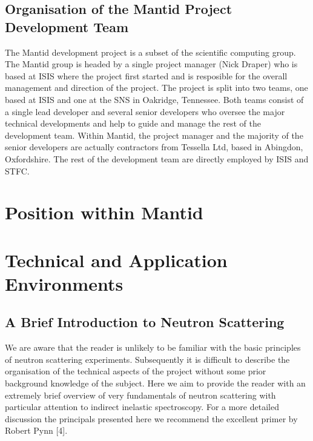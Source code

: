 \documentclass[paper=a4, fontsize=11pt]{scrartcl}	%
\numberwithin{equation}{section}															%
\numberwithin{figure}{section}																%
\numberwithin{table}{section}
\begin{document}
\subsection{Organisation of the Mantid Project Development
Team}\label{organisation-of-the-mantid-project-development-team}

The Mantid development project is a subset of the scientific computing
group. The Mantid group is headed by a single project manager (Nick
Draper) who is based at ISIS where the project first started and is
resposible for the overall management and direction of the project. The
project is split into two teams, one based at ISIS and one at the SNS in
Oakridge, Tennessee. Both teams consist of a single lead developer and
several senior developers who oversee the major technical developments
and help to guide and manage the rest of the development team. Within
Mantid, the project manager and the majority of the senior developers
are actually contractors from Tessella Ltd, based in Abingdon,
Oxfordshire. The rest of the development team are directly employed by
ISIS and STFC.

\section{Position within Mantid}\label{position-within-mantid}

\section{Technical and Application
Environments}\label{technical-and-application-environments}

\subsection{A Brief Introduction to Neutron
Scattering}\label{a-brief-introduction-to-neutron-scattering}

We are aware that the reader is unlikely to be familiar with the basic
principles of neutron scattering experiments. Subsequently it is
difficult to describe the organisation of the technical aspects of the
project without some prior background knowledge of the subject. Here we
aim to provide the reader with an extremely brief overview of very
fundamentals of neutron scattering with particular attention to indirect
inelastic spectroscopy. For a more detailed discussion the principals
presented here we recommend the excellent primer by Robert Pynn {[}4{]}.
\end{document}

